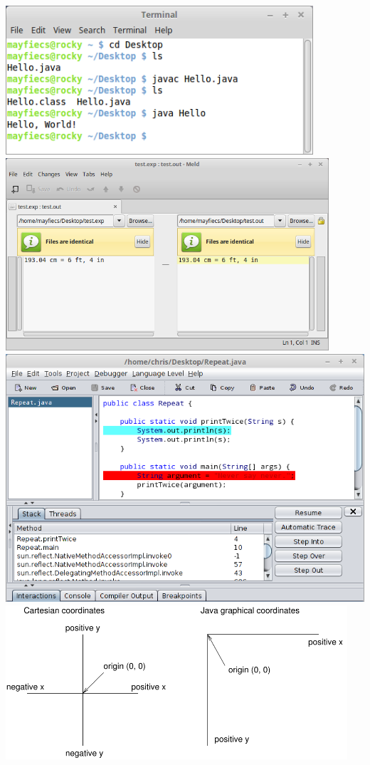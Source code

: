 \documentclass[12pt]{book}
\begin{document}
\clearpage%
\includegraphics[width=4.5in]{./figs/terminal.png}
\clearpage%
\includegraphics[width=0.9\textwidth]{./figs/meld.png}
\clearpage%
\includegraphics[width=\textwidth]{./figs/debugger.png}
\clearpage%
\includegraphics[width=5in]{./figs/coordinates.pdf}
\end{document}
